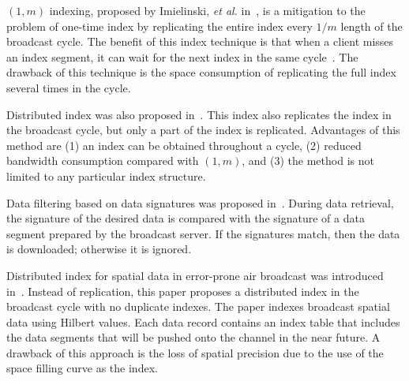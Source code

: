 $(1, m)$ indexing, proposed by Imielinski, \emph{et al.}
in~\cite{journals/tkde/ImielinskiVB97}, is a mitigation to the
problem of one-time index by replicating the entire index every
$1/m$ length of the broadcast cycle. The benefit of this index
technique is that when a client misses an index segment, it can
wait for the next index in the same
cycle~\cite{journals/tmc/KuZW08}. The drawback of this technique
is the space consumption of replicating the full index several
times in the cycle.

Distributed index was also proposed
in~\cite{journals/tkde/ImielinskiVB97}. This index also replicates
the index in the broadcast cycle, but only a part of the index is
replicated. Advantages of this method are (1) an index can be
obtained throughout a cycle, (2) reduced bandwidth consumption
compared with $(1, m)$, and (3) the method is not limited to any
particular index structure.



Data filtering based on data signatures was proposed
in~\cite{journals/winet/LeeL99}. During data retrieval, the
signature of the desired data is compared with the signature of a
data segment prepared by the broadcast server. If the signatures
match, then the data is downloaded; otherwise it is ignored.

Distributed index for spatial data in error-prone air broadcast
was introduced in~\cite{journals/vldb/ZhengLLLS09}. Instead of
replication, this paper proposes a distributed index in the
broadcast cycle with no duplicate indexes. The paper indexes
broadcast spatial data using Hilbert values. Each data record
contains an index table that includes the data segments that will
be pushed onto the channel in the near future. A drawback of this
approach is the loss of spatial precision due to the use of the
space filling curve as the index.


